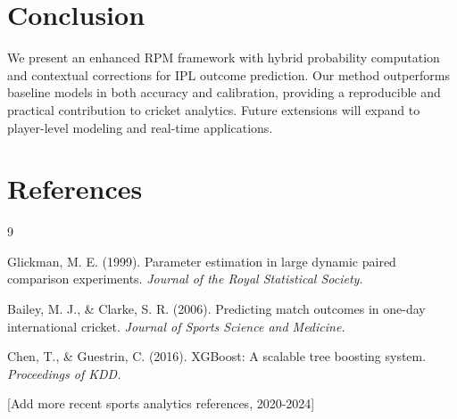 \documentclass{article}
\begin{document}
\section{Conclusion}
We present an enhanced RPM framework with hybrid probability computation and contextual corrections for IPL outcome prediction. Our method outperforms baseline models in both accuracy and calibration, providing a reproducible and practical contribution to cricket analytics. Future extensions will expand to player-level modeling and real-time applications.

\section*{References}
\begin{thebibliography}{9}

Glickman, M. E. (1999).
\newblock Parameter estimation in large dynamic paired comparison experiments.
\newblock \emph{Journal of the Royal Statistical Society.}

Bailey, M. J., \& Clarke, S. R. (2006).
\newblock Predicting match outcomes in one-day international cricket.
\newblock \emph{Journal of Sports Science and Medicine.}

Chen, T., \& Guestrin, C. (2016).
\newblock XGBoost: A scalable tree boosting system.
\newblock \emph{Proceedings of KDD.}

{[Add more recent sports analytics references, 2020-2024]}

\end{thebibliography}
\end{document}
